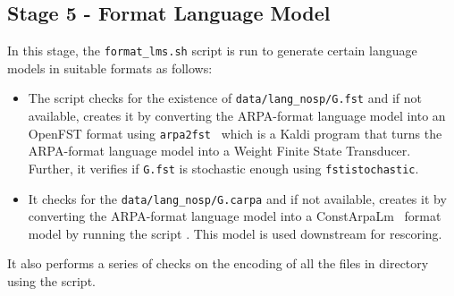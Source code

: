 \subsection{Stage 5 - Format Language Model}

In this stage, the \texttt{format\_lms.sh} script is run to generate certain language models in suitable formats as follows:
\begin{itemize}
    \item The script checks for the existence of \texttt{data/lang\_nosp/G.fst} and if not available, creates it by converting the ARPA-format language model  into an OpenFST format using \texttt{arpa2fst}~\cite{arpa2fst} which is a Kaldi program that turns the ARPA-format language model into a Weight Finite State Transducer. Further, it verifies if \texttt{G.fst} is stochastic enough using \texttt{fstistochastic}.
    \item It checks for the \texttt{data/lang\_nosp/G.carpa} and if not available, creates it by converting the ARPA-format language model  into a ConstArpaLm~\cite{constarpa}  format model by running the script . This model is used downstream for rescoring.
\end{itemize} 
 It also performs a series of checks on the encoding of all the files in  directory using the  script.
